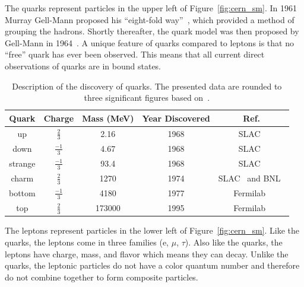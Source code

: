 The quarks represent particles in the upper left of Figure~\ref{fig:cern_sm}.
In 1961 Murray Gell-Mann proposed his ``eight-fold way''~\citep{eightfold_way_osti_4008239}, which provided a method of grouping the hadrons.
Shortly thereafter, the quark model was then proposed by Gell-Mann in 1964~\citep{quark_model_GELLMANN1964214}.
A unique feature of quarks compared to leptons is that no ``free'' quark has ever been observed.
This means that all current direct observations of quarks are in bound states.

\begin{table}
\begin{center}
\begin{tabular}{||c c c c c||}
 \hline
 Quark & Charge & Mass (MeV) & Year Discovered & Ref.\\ [0.5ex]
 \hline\hline
 up & $\frac{2}{3}$ & 2.16 & 1968 & SLAC~\citep{1969PhRvL..23..930B, 1969PhRvL..23..935B} \\
 \hline
 down & $\frac{-1}{3}$ & 4.67 & 1968 & SLAC~\citep{1969PhRvL..23..930B, 1969PhRvL..23..935B} \\
 \hline
 strange & $\frac{-1}{3}$ & 93.4 & 1968 & SLAC~\citep{1969PhRvL..23..930B, 1969PhRvL..23..935B} \\
 \hline
 charm & $\frac{2}{3}$ & 1270 & 1974 & SLAC~\citep{augustin1974observation} and BNL~\citep{Jpsi_PhysRevLett.33.1404} \\
 \hline
 bottom & $\frac{-1}{3}$ & 4180 & 1977 & Fermilab~\citep{bottom_PhysRevLett.39.252}\\
 \hline
 top & $\frac{2}{3}$ & 173000 & 1995 & Fermilab~\citep{topquark_Abachi_1995} \\
 \hline
\end{tabular}
\caption{Description of the discovery of quarks.
  The presented data are rounded to three significant figures based on~\citep{Workman:2022ynf}.}
\label{table:quark}
\end{center}
\end{table}

The leptons represent particles in the lower left of Figure~\ref{fig:cern_sm}.
Like the quarks, the leptons come in three families (e, $\mu$, $\tau$).
Also like the quarks, the leptons have charge, mass, and flavor which means they can decay.
Unlike the quarks, the leptonic particles do not have a color quantum number and therefore do not combine together to form composite particles.

